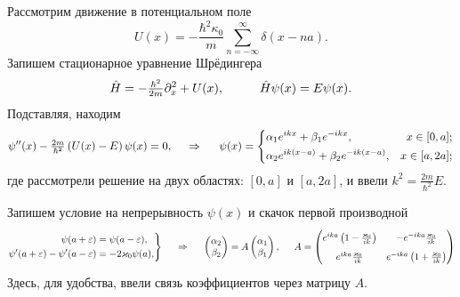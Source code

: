 Рассмотрим движение в потенциальном поле
\begin{equation*}
    U(x) = - \frac{\hbar^2 \kappa_0}{m} \sum_{n=-\infty}^{\infty} \delta(x-n a).
\end{equation*}
Запишем стационарное уравнение Шрёдингера
\begin{equation*}
    \hat{H} = - \tfrac{\hbar^2}{2m} \partial_x^2 + U(x), 
    \hspace{10 mm} 
    \hat{H} \psi(x) = E \psi(x).
\end{equation*}
Подставляя, находим
\begin{equation*}
    \psi''(x) - \tfrac{2m}{\hbar^2} \left(U(x) - E\right) \psi(x) = 0,
    \hspace{0.5cm} \Rightarrow \hspace{0.5cm}
    \psi(x) = \left\{\begin{aligned}
        &\alpha_1 e^{i k x} + \beta_1 e^{- i k x}, &x \in [0, a]; \\
        &\alpha_2 e^{i k (x-a)} + \beta_2 e^{-ik (x-a)}, &x \in [a, 2a];
    \end{aligned}\right.
\end{equation*}
где рассмотрели решение на двух областях: $[0, a]$ и $[a, 2a]$, и ввели $k^2 = \frac{2m}{\hbar^2} E$. 

Запишем условие на непрерывность $\psi(x)$ и скачок первой производной
\begin{equation*}
    \left.\begin{aligned}
        \psi(a+\varepsilon) &= \psi(a-\varepsilon), \\
        \psi'(a+\varepsilon) - \psi'(a-\varepsilon) &= - 2 \kappa_0 \psi(a),
    \end{aligned}\right\}
    \hspace{0.5cm} \Rightarrow \hspace{0.5cm}
    \begin{pmatrix}
        \alpha_2 \\ \beta_2
    \end{pmatrix} = 
    A \begin{pmatrix}
        \alpha_1 \\ \beta_1
    \end{pmatrix},
    \hspace{5 mm} 
    A = \begin{pmatrix}
        \bp
        e^{ika}\left(1-\frac{\kappa_0}{ik}\right) & -e^{-ika} \frac{\kappa_0}{ik}  \\
        \bp
        e^{ika} \frac{\kappa_0}{ik} & e^{-ika} \left(1 + \frac{\kappa_0}{i k}\right)  \\
    \end{pmatrix}
\end{equation*}
Здесь, для удобства, ввели связь коэффициентов через матрицу $A$.


